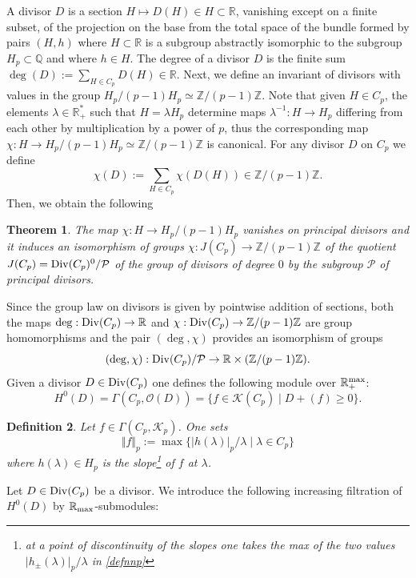 \documentclass{elsart3-1}
\newtheorem{theorem}{Theorem}[section]
\newtheorem{e-definition}[theorem]{Definition\rm}
\def\Q{{\mathbb Q}}
\def\R{{\mathbb R}}
\def\Z{{\mathbb Z}}
\def\cK{{\mathcal K}}
\def\cO{{\mathcal O}}
\def\cP{{\mathcal P}}
\def\rmax{\R_+^{\rm max}}
\def\rma{\R_{\rm max}}
\def\div{{\rm Div}}
\def\vsp{\vspace{.05in}}
\begin{document}
A divisor  $D$ is a section $H\mapsto D(H)\in H\subset \R$, vanishing except on a finite subset, of the projection on the base from the total space of the bundle formed by pairs $(H,h)$ where $H\subset \R$ is a subgroup abstractly isomorphic to the subgroup $H_p\subset \Q$ and where $h\in H$. The degree of a divisor $D$ is the finite sum $\deg(D):=\sum_{H\in C_p} D(H)\in\R$. 
Next, we define an invariant of divisors with values in the group $H_p/(p-1)H_p\simeq \Z/(p-1)\Z$. Note that given $H\in C_p$, the elements $\lambda\in \R_+^*$ such that $H=\lambda H_p$ determine maps $\lambda^{-1}:H\to H_p$ differing from each other by multiplication by a power of $p$, thus  the corresponding map $\chi:H\to H_p/(p-1)H_p\simeq \Z/(p-1)\Z$ is canonical. For any divisor $D$ on $C_p$ we define
\begin{equation*}%
\chi(D):=\sum_{H\in C_p} \chi(D(H))\in \Z/(p-1)\Z.
\end{equation*}
Then, we obtain the following\vsp
\begin{theorem}\label{thmjaccp} The map $\chi: H\to H_p/(p-1)H_p$ vanishes on principal divisors and it induces an isomorphism of groups $\chi:J(C_p)\to \Z/(p-1)\Z$ of the quotient  $J(C_p)=\div(C_p)^0/\cP$ of the group of divisors of degree $0$ by the subgroup $\cP$ of principal divisors.	
\end{theorem}
\vsp
Since the group law on divisors is given by pointwise addition of sections, both the maps $\deg:\div(C_p)\to \R$ and $\chi:\div(C_p)\to \Z/(p-1)\Z$ are group homomorphisms and the pair $(\deg,\chi)$ provides an isomorphism of groups 
\begin{equation}\label{jacmapbis}
(\deg,\chi):\div(C_p)/\cP\to \R\times (\Z/(p-1)\Z).
\end{equation}
 Given a divisor $D\in \div(C_p)$ one defines the following module over $\rmax$:
$$
H^0(D)=\Gamma(C_p,\cO(D)) =\{f\in \cK(C_p)\mid D+(f)\geq 0\}.
$$
\begin{e-definition}\label{pnorm} Let $f\in \Gamma(C_p,\cK_p)$.  	
 One sets  	
\begin{equation}\label{defnnp}
\Vert f\Vert_p :=\max \{\vert h(\lambda)\vert_p/\lambda\mid \lambda \in C_p\}\end{equation}
where $h(\lambda)\in H_p$ is the slope\footnote{at a point of discontinuity of the slopes one takes the max of the two values $\vert h_\pm(\lambda)\vert_p/\lambda$ in \eqref{defnnp}} of $f$ at $\lambda$.
\end{e-definition}
\vsp
Let $D\in \div(C_p)$ be a divisor. We introduce the following  increasing filtration of $H^0(D)$ by $\rma$-submodules:
\end{document}
